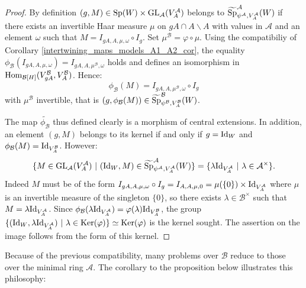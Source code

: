 \documentclass[11pt]{article}
\theoremstyle{plain}
\theoremstyle{definition}
\theoremstyle{plain}
\theoremstyle{definition}
\theoremstyle{plain}
\begin{document}
\begin{proof} By definition $(g,M) \in \textup{Sp}(W) \times \textup{GL}_\mathcal{A}(V_A^\mathcal{A})$ belongs to $\widetilde{\textup{Sp}}_{\psi^\mathcal{A},V_A^\mathcal{A}}^\mathcal{A}(W)$ if there exists an invertible Haar measure $\mu$ on $gA \cap A \backslash A$ with values in $\mathcal{A}$ and an element $\omega$ such that $M = I_{gA,A,\mu,\omega} \circ I_g$. Set $\mu^\mathcal{B} = \varphi \circ \mu$. Using the compatibiliy of Corollary \ref{intertwining_maps_models_A1_A2_cor}, the equality $\phi_\mathcal{B}(I_{gA,A,\mu,\omega})=I_{gA,A,\mu^\mathcal{B},\omega}$ holds and defines an isomorphism in $\textup{Hom}_{\mathcal{B}[H]}(V_{gA}^\mathcal{B},V_A^\mathcal{B})$. Hence:
$$\phi_\mathcal{B}(M) = I_{gA,A,\mu^\mathcal{B},\omega} \circ I_g$$
with $\mu^\mathcal{B}$ invertible, that is $(g,\phi_\mathcal{B}(M)) \in \widetilde{\textup{Sp}}_{\psi^\mathcal{B},V_A^\mathcal{B}}^\mathcal{B}(W)$.

The map $\widetilde{\phi_\mathcal{B}}$ thus defined clearly is a morphism of central extensions. In addition, an element $(g,M)$ belongs to its kernel if and only if $g = \textup{Id}_W$ and $\phi_\mathcal{B}(M)=\textup{Id}_{V_A^\mathcal{B}}$. However:
$$\{M \in \textup{GL}_\mathcal{A}(V_A^\mathcal{A}) \ | \ (\textup{Id}_W,M) \in \widetilde{\textup{Sp}}_{\psi^\mathcal{A},V_A^\mathcal{A}}^\mathcal{A}(W) \} = \{ \lambda \textup{Id}_{V_A^\mathcal{A}} \ | \ \lambda \in \mathcal{A}^\times\}.$$
Indeed $M$  must be of the form $I_{gA,A,\mu,\omega} \circ I_g = I_{A,A,\mu,0} = \mu(\{0\}) \times \textup{Id}_{V_A^\mathcal{A}}$ where $\mu$ is an invertible measure of the singleton $\{0\}$, so there exists $\lambda \in \mathcal{B}^\times$ such that $M = \lambda \textup{Id}_{V_A^\mathcal{A}}$. Since $\phi_\mathcal{B}(\lambda \textup{Id}_{V_A^\mathcal{A}}) = \varphi(\lambda) \textup{Id}_{V_A^\mathcal{B}}$, the group $\{(\textup{Id}_W,\lambda \textup{Id}_{V_A^\mathcal{A}}) \ | \  \lambda \in \textup{Ker}(\varphi) \} \simeq \textup{Ker}(\varphi)$ is the kernel sought. The assertion on the image follows from the form of this kernel. \end{proof}

Because of the previous compatibility, many problems over $\mathcal{B}$ reduce to those over the minimal ring $\mathcal{A}$. The corollary to the proposition below illustrates this philosophy:
\end{document}
